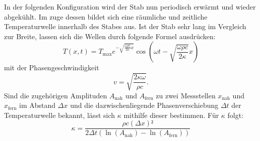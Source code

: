 In der folgenden Konfiguration wird der Stab nun periodisch erwärmt und
 wieder abgekühlt.
 Im zuge dessen bildet sich eine räumliche und zeitliche Temperaturwelle
  innerhalb des Stabes aus. Ist der Stab sehr lang im Vergleich zur Breite, lassen
   sich die Wellen durch folgende Formel ausdrücken:
  \begin{equation}
    T(x,t) = T_\text{max}e^{-\sqrt{{\frac{\omega \rho c}{2\kappa}}x}}\cos \left( \omega t - \sqrt{\frac{\omega \rho c}{2\kappa}}x \right)
  \end{equation}
mit der Phasengeschwindigkeit
\begin{equation}
  v = \sqrt{\frac{2 \kappa \omega}{\rho c}}\text{.}
\end{equation}
Sind die zugehörigen Amplituden $A_\text{nah}$ und $A_\text{fern}$ zu zwei Messstellen
$x_\text{nah}$ und $x_\text{fern}$ im Abstand $\Delta x$ und die dazwischenliegende Phasenverschiebung $\Delta t$
 der Temperaturwelle bekannt, lässt sich $\kappa$ mithilfe dieser bestimmen. Für $\kappa$ folgt:
 \begin{equation}
   \kappa = \frac{\rho c (\Delta x)²}{2 \Delta t (\ln(A_\text{nah})-\ln(A_\text{fern}))}
 \end{equation}
